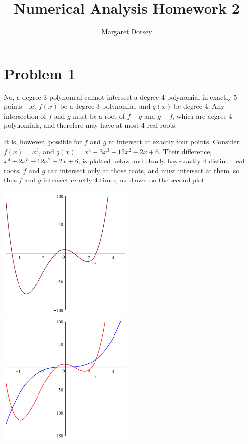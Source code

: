 \documentclass[11pt]{article} %
\title{Numerical Analysis Homework 2}
\author{Margaret Dorsey}
\begin{document}
\maketitle

\section*{Problem 1}
No, a degree 3 polynomial cannot intersect a degree 4 polynomial in exactly 5 points - let $f(x)$ be a degree $3$ polynomial, and $g(x)$ be degree 4. Any intersection of $f$ and $g$
must be a root of $f-g$ and $g-f$, which are degree 4 polynomials, and therefore may have at most $4$ real roots. 

\par It is, however, possible for $f$ and $g$ to intersect at exactly four points. Consider $f(x) = x^3$, and $g(x) = x^4 + 3x^3 - 12x^2 - 2x + 6$. Their difference,
$x^4+2x^3-12x^2 - 2x +6$, is plotted below and clearly has exactly $4$ distinct real roots. $f$ and $g$ can intersect only at those roots, and must intersect at them, so thus $f$ and $g$ intersect
exactly 4 times, as shown on the second plot. 

\includegraphics[width=0.5\textwidth]{plots/problem1plot1.png}
\includegraphics[width=0.5\textwidth]{plots/problem1plot2.png}
\end{document}
